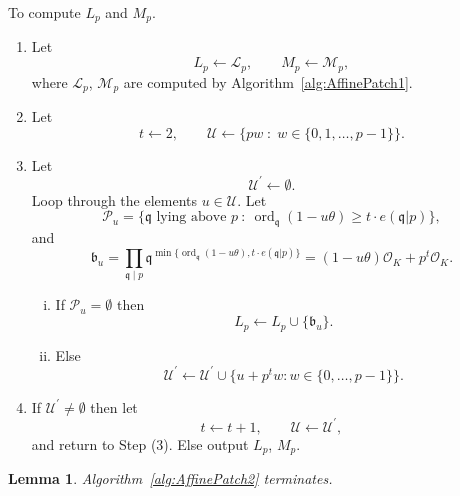 \documentclass[11pt]{report}
\newtheorem{lemma}[theorem]{Lemma}
\theoremstyle{definition}
\DeclareMathOperator{\ord}{ord}
\begin{document}
\begin{algorithm}\label{alg:AffinePatch2}
To compute $L_p$ and $M_p$.

\begin{enumerate}[Step (1)]
\item Let
\[ L_p \leftarrow \mathcal{L}_p, \qquad M_p \leftarrow \mathcal{M}_p,\]
where $\mathcal{L}_p$, $\mathcal{M}_p$ are computed by Algorithm~\ref{alg:AffinePatch1}.
\item Let
\[ t \leftarrow 2, \qquad \mathcal{U} \leftarrow \{pw \; : \; w \in \{0,1,\dots,p-1\} \}.\]
\item Let
\[ \mathcal{U}^{\prime} \leftarrow \emptyset.\]
Loop through the elements $u \in \mathcal{U}$. Let
\[\mathcal{P}_u=\{\mathfrak{q} \text{ lying above } p \ : \ \ord_{\mathfrak{q}}(1-u\theta ) \ge t \cdot e(\mathfrak{q}|p)\},\]
and
\[ \mathfrak{b}_u=\prod_{\mathfrak{q} \mid p} \mathfrak{q}^{\min\{\ord_{\mathfrak{q}}(1-u\theta ), t \cdot e(\mathfrak{q}|p)\}} =(1-u\theta) \mathcal{O}_K+p^t \mathcal{O}_K.\]

\begin{enumerate}[(i)]
\item If $\mathcal{P}_u=\emptyset$
then
\[L_p \leftarrow L_p \cup \{\mathfrak{b}_u\}.\]
\item Else
\[\mathcal{U}^\prime \leftarrow \mathcal{U}^\prime \cup \{ u+p^{t}w : w \in \{0,\dotsc,p-1\} \}.\]
\end{enumerate}

\item If $\mathcal{U}^\prime \ne \emptyset$ then let
\[t \leftarrow t+1, \qquad \mathcal{U} \leftarrow \mathcal{U}^\prime,\]
and return to Step (3). Else output $L_p$, $M_p$.
\end{enumerate}
\end{algorithm}

\begin{lemma}
Algorithm~\ref{alg:AffinePatch2} terminates.
\end{lemma}
\end{document}
